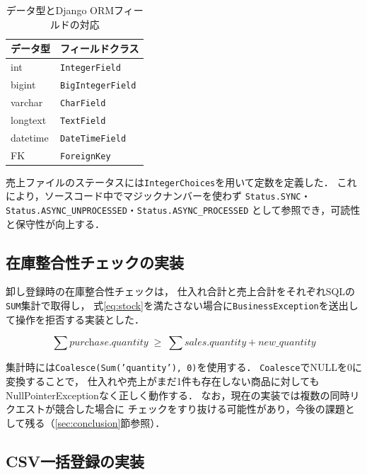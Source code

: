 \documentclass[submit,techrep]{ipsj}
\begin{document}
\begin{table}[H]
  \caption{データ型とDjango ORMフィールドの対応}
  \label{tab:fields}
  \vspace{2mm}
  \centering
  \small
  \begin{tabular}{ll}
    \hline\hline
    \textbf{データ型} & \textbf{フィールドクラス} \\
    \hline
    int          & \texttt{IntegerField} \\
    bigint       & \texttt{BigIntegerField} \\
    varchar      & \texttt{CharField} \\
    longtext     & \texttt{TextField} \\
    datetime     & \texttt{DateTimeField} \\
    FK           & \texttt{ForeignKey} \\
    \hline
  \end{tabular}
\end{table}

売上ファイルのステータスには\texttt{IntegerChoices}を用いて定数を定義した．
これにより，ソースコード中でマジックナンバーを使わず
\texttt{Status.SYNC}・\texttt{Status.ASYNC\_UNPROCESSED}・\texttt{Status.ASYNC\_PROCESSED}
として参照でき，可読性と保守性が向上する．

\subsection{在庫整合性チェックの実装}
\label{sec:impl}

卸し登録時の在庫整合性チェックは，
仕入れ合計と売上合計をそれぞれSQLの\texttt{SUM}集計で取得し，
式\eqref{eq:stock}を満たさない場合に\texttt{BusinessException}を送出して操作を拒否する実装とした．

\begin{equation}
  \sum \textit{purchase.quantity}
  \;\geq\;
  \sum \textit{sales.quantity} + \textit{new\_quantity}
  \label{eq:stock}
\end{equation}

集計時には\texttt{Coalesce(Sum('quantity'), 0)}を使用する．
\texttt{Coalesce}でNULLを0に変換することで，
仕入れや売上がまだ1件も存在しない商品に対しても
NullPointerExceptionなく正しく動作する．
なお，現在の実装では複数の同時リクエストが競合した場合に
チェックをすり抜ける可能性があり，今後の課題として残る（\ref{sec:conclusion}節参照）．

\subsection{CSV一括登録の実装}
\label{sec:csv}
\end{document}
